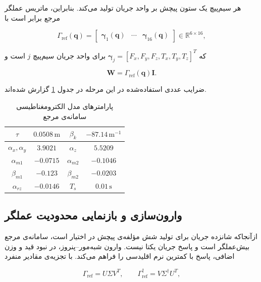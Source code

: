 هر سیم‌پیچ یک ستون پیچش بر واحد جریان تولید می‌کند. بنابراین، ماتریس عملگر مرجع برابر است با

\begin{equation}
	\Gamma_{\mathrm{ref}}(\mathbf q)=
	\begin{bmatrix}\boldsymbol{\gamma}_1(\mathbf q)&\cdots&\boldsymbol{\gamma}_{16}(\mathbf q)\end{bmatrix}
	\in\mathbb R^{6\times16},
	\label{eq:method-Gamma-def}
\end{equation}

که $\boldsymbol{\gamma}_j=[F_x,F_y,F_z,T_x,T_y,T_z]^T$ برای واحد جریان سیم‌پیچ $j$ است و

\begin{equation}
	\mathbf W=\Gamma_{\mathrm{ref}}(\mathbf q)\mathbf I.
	\label{eq:method-wrench-net}
\end{equation}

ضرایب عددی استفاده‌شده در این مرحله در جدول \ref{tab:method-parameters} گزارش شده‌اند.

\begin{table}[htbp]
	\centering
	\caption{پارامترهای مدل الکترومغناطیسی سامانه‌ی مرجع}
	\label{tab:method-parameters}
	\begin{tabular}{|c|c||c|c|}
		\hline
		$\tau$ & $0.0508\,\mathrm m$ & $\beta_k$ & $-87.14\,\mathrm{m^{-1}}$\\ \hline
		$\alpha_x,\alpha_y$ & $3.9021$ & $\alpha_z$ & $5.5209$\\ \hline
		$\alpha_{m1}$ & $-0.0715$ & $\alpha_{m2}$ & $-0.1046$\\ \hline
		$\beta_{m1}$ & $-0.123$ & $\beta_{m2}$ & $-0.0203$\\ \hline
		$\alpha_{rz}$ & $-0.0146$ & $T_s$ & $0.01\,\mathrm s$\\ \hline
	\end{tabular}
\end{table}

\subsection{وارون‌سازی و بازنمایی محدودیت عملگر}
\label{subsec:method-pinv}

ازآنجاکه شانزده جریان برای تولید شش مؤلفه‌ی پیچش در اختیار است، سامانه‌ی مرجع بیش‌عملگر است و پاسخ جریان یکتا نیست. وارون شبه‌مور--پنروز، در نبود قید و وزن اضافی، پاسخ با کمترین نرم اقلیدسی را فراهم می‌کند. با تجزیه‌ی مقادیر منفرد

\begin{equation}
	\Gamma_{\mathrm{ref}}=U\Sigma V^T,
	\qquad \Gamma_{\mathrm{ref}}^{\dagger}=V\Sigma^{\dagger}U^T,
	\label{eq:method-svd}
\end{equation}

